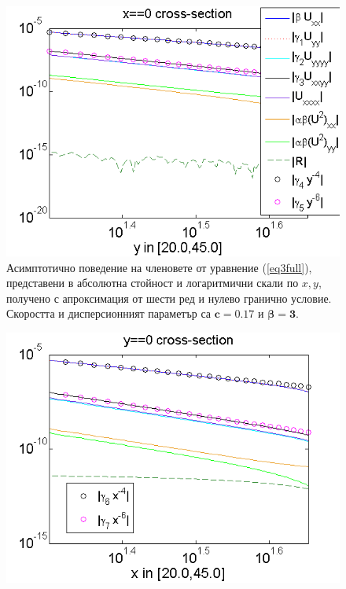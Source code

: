 \documentclass[a4paper]{article}
\newcommand{\rf}[1]{(\ref{#1})}
\theoremstyle{remark}
\begin{document}
\begin{large}
\begin{figure}[ht]
\begin{minipage}[b]{0.95\linewidth}
	\end{minipage}
	\begin{minipage}[b]{0.95\linewidth}
		 \raggedright
		\includegraphics[width=\linewidth]{AssymptForEachTerm/c017_bt1_5/ChristovIC_AlongY_50_ZB2_bt3_c017_h020_O(h^6).png}
	\end{minipage}
	\caption{Асимптотично поведение на членовете от уравнение \rf{eq3full}, представени в абсолютна стойност и логаритмични скали по $x,y$, получено с апроксимация от шести ред и нулево гранично условие. Скоростта и дисперсионният параметър са $\boldsymbol{c=0.17}$ и $\boldsymbol{\beta = 3}$.}
	\label{fig:assympt_c017bt3}
\end{figure}
\FloatBarrier
\begin{figure}[ht]
	\begin{minipage}[b]{0.95\linewidth}
		\raggedleft
		\includegraphics[width=\linewidth]{AssymptForEachTerm/c017_bt1_5/ChristovIC_AlongX_50_ZB2_bt5_c017_h020_O(h^6).png}

\end{minipage}
\end{figure}
\end{large}
\end{document}
